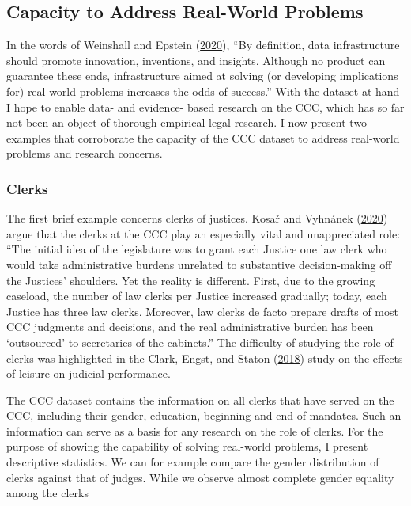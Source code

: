 \documentclass[
  11pt,
]{article}
\begin{document}
\hypertarget{capacity-to-address-real-world-problems}{%
\subsection{Capacity to Address Real-World
Problems}\label{capacity-to-address-real-world-problems}}

In the words of Weinshall and Epstein
(\protect\hyperlink{ref-weinshallDevelopingHighQualityData2020}{2020}),
``By definition, data infrastructure should promote innovation,
inventions, and insights. Although no product can guarantee these ends,
infrastructure aimed at solving (or developing implications for)
real-world problems increases the odds of success.'' With the dataset at
hand I hope to enable data- and evidence- based research on the CCC,
which has so far not been an object of thorough empirical legal
research. I now present two examples that corroborate the capacity of
the CCC dataset to address real-world problems and research concerns.

\hypertarget{clerks}{%
\subsubsection{Clerks}\label{clerks}}

The first brief example concerns clerks of justices. Kosař and Vyhnánek
(\protect\hyperlink{ref-kosarConstitutionalCourtCzechia2020}{2020})
argue that the clerks at the CCC play an especially vital and
unappreciated role: ``The initial idea of the legislature was to grant
each Justice one law clerk who would take administrative burdens
unrelated to substantive decision-making off the Justices' shoulders.
Yet the reality is different. First, due to the growing caseload, the
number of law clerks per Justice increased gradually; today, each
Justice has three law clerks. Moreover, law clerks de facto prepare
drafts of most CCC judgments and decisions, and the real administrative
burden has been `outsourced' to secretaries of the cabinets.'' The
difficulty of studying the role of clerks was highlighted in the Clark,
Engst, and Staton
(\protect\hyperlink{ref-clarkEstimatingEffectLeisure2018}{2018}) study
on the effects of leisure on judicial performance.

The CCC dataset contains the information on all clerks that have served
on the CCC, including their gender, education, beginning and end of
mandates. Such an information can serve as a basis for any research on
the role of clerks. For the purpose of showing the capability of solving
real-world problems, I present descriptive statistics. We can for
example compare the gender distribution of clerks against that of
judges. While we observe almost complete gender equality among the
clerks
\end{document}
